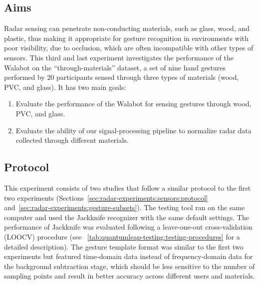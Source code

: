 \subsection{Aims} \label{sec:radar-experiments:through-materials:aims}
Radar sensing can penetrate non-conducting materials, such as glass, wood, and plastic, thus making it appropriate for gesture recognition in environments with poor visibility, \eg due to occlusion, which are often incompatible with other types of sensors. This third and last experiment investigates the performance of the Walabot on the ``through-materials'' dataset, a set of nine hand gestures performed by 20 participants sensed through three types of materials (wood, PVC, and glass). It has two main goals:
\begin{enumerate}
    \item Evaluate the performance of the Walabot for sensing gestures through wood, PVC, and glass.
    \item Evaluate the ability of our signal-processing pipeline to normalize radar data collected through different materials.
\end{enumerate}

\subsection{Protocol} \label{sec:radar-experiments:through-materials:protocol}
This experiment consists of two studies that follow a similar protocol to the first two experiments (Sections~\ref{sec:radar-experiments:sensors:protocol} and~\ref{sec:radar-experiments:gesture-subsets}). The \ql testing tool ran on the same computer and used the Jackknife recognizer with the same default settings. The performance of Jackknife was evaluated following a leave-one-out cross-validation (LOOCV) procedure (see \tab~\ref{tab:quantumleap-testing:testing-procedures} for a detailed description).
The gesture template format was similar to the first two experiments but featured time-domain data instead of frequency-domain data for the background subtraction stage, which should be less sensitive to the number of sampling points and result in better accuracy across different users and materials. 

